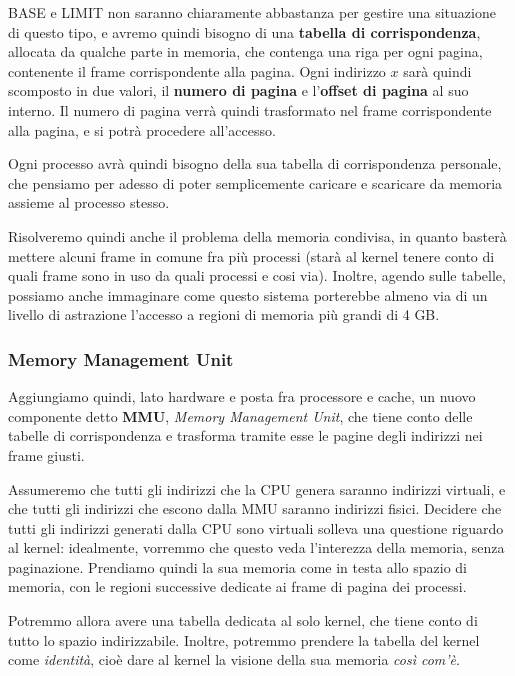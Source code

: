 \documentclass[a4paper,11pt]{article}
\begin{document}
BASE e LIMIT non saranno chiaramente abbastanza per gestire una situazione di questo tipo, e avremo quindi bisogno di una \textbf{tabella di corrispondenza}, allocata da qualche parte in memoria, che contenga una riga per ogni pagina, contenente il frame corrispondente alla pagina.
Ogni indirizzo $x$ sarà quindi scomposto in due valori, il \textbf{numero di pagina} e l'\textbf{offset di pagina} al suo interno.
Il numero di pagina verrà quindi trasformato nel frame corrispondente alla pagina, e si potrà procedere all'accesso.

Ogni processo avrà quindi bisogno della sua tabella di corrispondenza personale, che pensiamo per adesso di poter semplicemente caricare e scaricare da memoria assieme al processo stesso.

Risolveremo quindi anche il problema della memoria condivisa, in quanto basterà mettere alcuni frame in comune fra più processi (starà al kernel tenere conto di quali frame sono in uso da quali processi e cosi via).
Inoltre, agendo sulle tabelle, possiamo anche immaginare come questo sistema porterebbe almeno via di un livello di astrazione l'accesso a regioni di memoria più grandi di 4 GB.

\subsubsection{Memory Management Unit}
Aggiungiamo quindi, lato hardware e posta fra processore e cache, un nuovo componente detto \textbf{MMU}, \textit{Memory Management Unit}, che tiene conto delle tabelle di corrispondenza e trasforma tramite esse le pagine degli indirizzi nei frame giusti.

Assumeremo che tutti gli indirizzi che la CPU genera saranno indirizzi virtuali, e che tutti gli indirizzi che escono dalla MMU saranno indirizzi fisici.
Decidere che tutti gli indirizzi generati dalla CPU sono virtuali solleva una questione riguardo al kernel: idealmente, vorremmo che questo veda l'interezza della memoria, senza paginazione.
Prendiamo quindi la sua memoria come in testa allo spazio di memoria, con le regioni successive dedicate ai frame di pagina dei processi.

Potremmo allora avere una tabella dedicata al solo kernel, che tiene conto di tutto lo spazio indirizzabile.
Inoltre, potremmo prendere la tabella del kernel come \textit{identità}, cioè dare al kernel la visione della sua memoria \textit{così com'è}.
\end{document}
